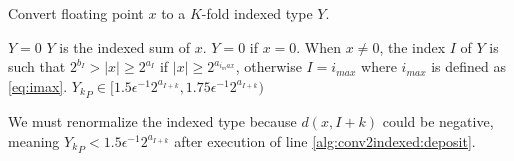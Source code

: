     \begin{samepage}
    \begin{alg}
      Convert floating point $x$ to a $K$-fold indexed type $Y$.
      \begin{algorithmic}[1]
          \State $Y = 0$
          \State {}
          \State {} \label{alg:conv2indexed:deposit}
          \State {}
        \EndFunction
        \Ensure
          $Y$ is the indexed sum of $x$. $Y=0$ if $x=0$.
          When $x \neq 0$, the index $I$ of $Y$ is such that $2^{b_I} > |x| \geq 2^{a_I}$
          if $|x| \geq 2^{a_{i_max}}$, otherwise $I = i_{max}$ where $i_{max}$ is defined as \eqref{eq:imax}.
          ${Y_k}_P \in [1.5  \epsilon^{-1} 2^{a_{I + k}}, 1.75  \epsilon^{-1} 2^{a_{I + k}})$
      \end{algorithmic}
      \label{alg:conv2indexed}
    \end{alg}
    \end{samepage}

    We must renormalize the indexed type because $d(x, I + k)$ could be
    negative, meaning ${Y_k}_P < 1.5  \epsilon^{-1} 2^{a_{I + k}}$ after
    execution of line \ref{alg:conv2indexed:deposit}.


